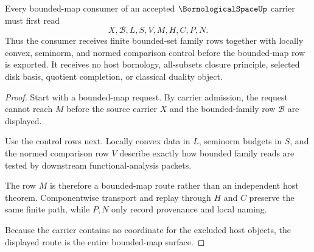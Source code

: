 \begin{theorem}
\label{thm:bornological-space-bounded-map-route}
Every bounded-map consumer of an accepted $\BornologicalSpaceUp$ carrier must first read
$$
X,\mathcal{B},L,S,V,M,H,C,P,N .
$$
Thus the consumer receives finite bounded-set family rows together with locally convex, seminorm, and normed comparison control before the bounded-map row is exported. It receives no host bornology, all-subsets closure principle, selected disk basis, quotient completion, or classical duality object.
\end{theorem}
\begin{proof}
Start with a bounded-map request. By carrier admission, the request cannot reach $M$ before the source carrier $X$ and the bounded-family row $\mathcal{B}$ are displayed.

Use the control rows next. Locally convex data in $L$, seminorm budgets in $S$, and the normed comparison row $V$ describe exactly how bounded family reads are tested by downstream functional-analysis packets.

The row $M$ is therefore a bounded-map route rather than an independent host theorem. Componentwise transport and replay through $H$ and $C$ preserve the same finite path, while $P,N$ only record provenance and local naming.

Because the carrier contains no coordinate for the excluded host objects, the displayed route is the entire bounded-map surface.
\end{proof}




